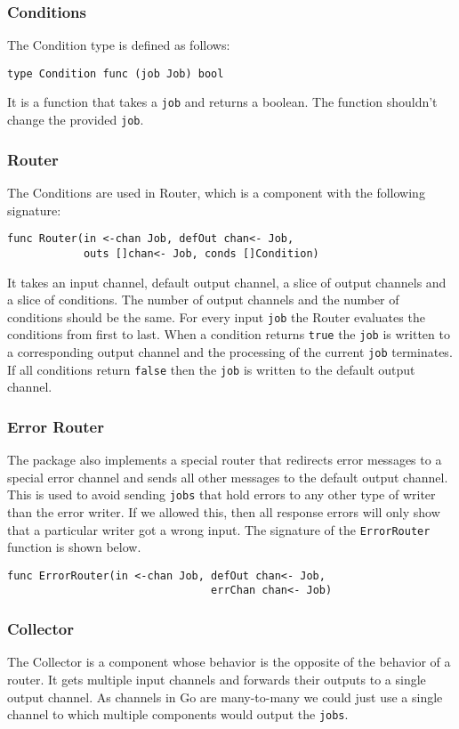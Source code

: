 \subsubsection{Conditions}
The Condition type is defined as follows:
\begin{lstlisting}
type Condition func (job Job) bool
\end{lstlisting}
It is a function that takes a \texttt{job} and returns a boolean.
The function shouldn't change the provided \texttt{job}.

\subsubsection{Router}
The Conditions are used in Router, which is a component with the 
following signature:
\begin{lstlisting}
func Router(in <-chan Job, defOut chan<- Job, 
            outs []chan<- Job, conds []Condition)
\end{lstlisting}
It takes an input channel, default output channel, a slice of output channels 
and a slice of conditions.
The number of output channels and the number of conditions should be the same.
For every input \texttt{job} the Router evaluates the conditions from first to last.
When a condition returns \texttt{true} the \texttt{job} is written to a 
corresponding output channel 
and the processing of the current \texttt{job} terminates. If all conditions 
return \texttt{false} then the \texttt{job} is written to the default output channel.

\subsubsection{Error Router}
The package also implements a special router that redirects error messages
to a special error channel and sends all other messages to the default output 
channel. This is used to avoid sending \texttt{jobs} that hold errors to 
any other type of writer than the error writer. If we allowed this, then
all response errors will only show that a particular writer got a wrong input.
The signature of the \texttt{ErrorRouter} function is shown below.
\begin{lstlisting}
func ErrorRouter(in <-chan Job, defOut chan<- Job, 
                                errChan chan<- Job)
\end{lstlisting}

\subsubsection{Collector}
The Collector is a component whose behavior is the opposite of the behavior 
of a router. It gets multiple input channels
and forwards their outputs to a single output channel. As channels
in Go are many-to-many we could just use a single channel to which
multiple components would output the \texttt{jobs}. 

